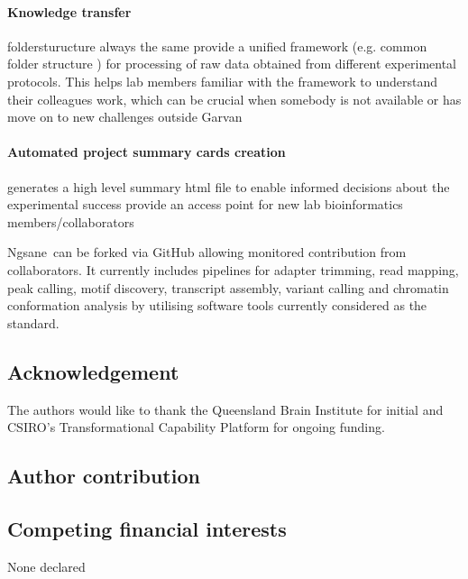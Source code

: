 \documentclass{bioinfo}
\newcommand{\prog}{{\sc Ngsane}}
\begin{document}
\paragraph{Knowledge transfer}
foldersturucture always the same 
provide a unified framework (e.g. common folder structure ) for processing of raw data obtained from different experimental protocols. This helps lab members familiar with the framework to understand their colleagues work, which can be crucial when somebody is not available or has move on to new challenges outside Garvan

\paragraph{Automated project summary cards creation}
generates a high level summary html file to enable informed decisions about the experimental success
provide an access point for new lab bioinformatics members/collaborators








\prog\ can be forked via GitHub allowing monitored contribution from collaborators. 
It currently includes pipelines for adapter trimming, read mapping, peak calling, motif discovery, transcript assembly, variant calling and chromatin conformation analysis by utilising software tools currently considered as the standard. 



\subsection*{Acknowledgement}
The authors would like to thank the Queensland Brain Institute for initial and CSIRO's Transformational Capability Platform for ongoing funding.  

\subsection*{Author contribution}

\subsection*{Competing financial interests}
None declared



\end{document}
